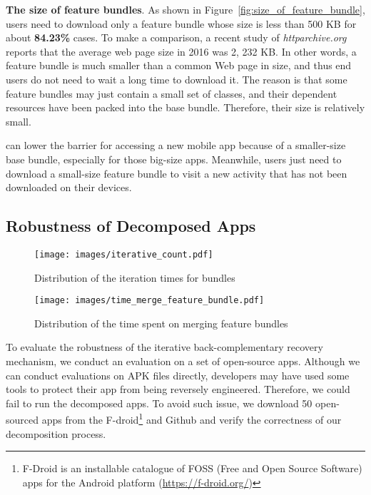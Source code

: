 \noindent\textbf{The size of feature bundles}. As shown in Figure~\ref{fig:size_of_feature_bundle}, users need to download only a feature bundle whose size is less than 500 KB for about \textbf{84.23\%} cases. To make a comparison, a recent study of \textit{httparchive.org}~\cite{httparchive} reports that the average web page size in 2016 was 2, 232 KB. In other words, a feature bundle is much smaller than a common Web page in size, and thus end users do not need to wait a long time to download it. The reason is that some feature bundles may just contain a small set of classes, and their dependent resources have been packed into the base bundle. Therefore, their size is relatively small.


\nickName can lower the barrier for accessing a new mobile app because of a smaller-size base bundle, especially for those big-size apps. Meanwhile, users just need to download a small-size feature bundle to visit a new activity that has not been downloaded on their devices.


\subsection{Robustness of Decomposed Apps}
\label{subsec:robustness}



\begin{figure}[!t]
\centering
\begin{minipage}[t]{0.4\linewidth}
	\centering
   	\texttt{[image: images/iterative\_count.pdf]}
   	\caption{Distribution of the iteration times for bundles}
   	\label{fig:iterative_count}
\end{minipage}\hspace{.1cm}
\begin{minipage}[t]{0.4\linewidth}
	\centering
   	\texttt{[image: images/time\_merge\_feature\_bundle.pdf]}
    \caption{Distribution of the time spent on merging feature bundles}
    \label{fig:time_on_merge_feature_bundle}
\end{minipage}
\end{figure}

To evaluate the robustness of the iterative back-complementary recovery mechanism, we conduct an evaluation on a set of open-source apps.
Although we can conduct evaluations on APK files directly, developers may have used some tools to protect their app from being reversely engineered. 
Therefore, we could fail to run the decomposed apps. 
To avoid such issue, we download 50 open-sourced apps from the F-droid\footnote{F-Droid is an installable catalogue of FOSS (Free and Open Source Software) apps for the Android platform (\url{https://f-droid.org/})} and Github and verify the correctness of our decomposition process.

